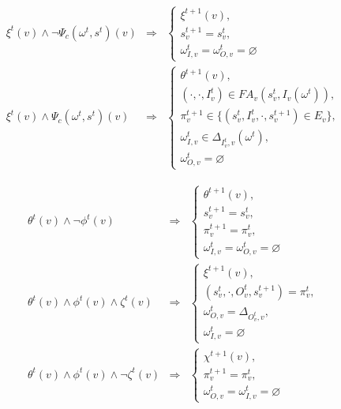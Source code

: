 \documentclass[10pt,a4paper]{article}
\newcommand{\FA}{F\!A}
\begin{document}
\begin{eqnarray}
  \xi^t(v) \wedge \neg \Psi_c(\omega^t, s^t)(v) & \Rightarrow &
    \begin{cases}
      \xi^{t + 1}(v), \\
      s^{t + 1}_v = s^t_v, \\
      \omega^t_{I, v} = \omega^t_{O, v} = \varnothing
    \end{cases} \label{freetofree} \\
  \xi^t(v) \wedge \Psi_c(\omega^t, s^t)(v) & \Rightarrow &
    \begin{cases}
      \theta^{t + 1}(v), \\
      (\cdot, \cdot, I^t_v) \in \FA_v(s^{t}_v, I_v(\omega^t)), \\
      \pi^{t + 1}_v \in \{ (s^t_v, I^t_v, \cdot, s^{t + 1}_v) \in E_v\}, \\
      \omega^t_{I, v} \in \Delta_{I^t_v, v}(\omega^t), \\
      \omega^t_{O, v} = \varnothing
    \end{cases} \label{freetostart}
\end{eqnarray}

\begin{eqnarray}
  \theta^t(v) \wedge \neg \phi^t(v) & \Rightarrow &
   \begin{cases}
     \theta^{t + 1}(v), \\
     s^{t + 1}_v = s^t_v, \\
     \pi^{t + 1}_v = \pi^t_v, \\
     \omega^t_{I, v} = \omega^t_{O, v} = \varnothing
   \end{cases} \label{worktowork} \\
  \theta^t(v) \wedge \phi^t(v) \wedge \zeta^t(v) & \Rightarrow &
    \begin{cases}
      \xi^{t + 1}(v), \\
      (s^t_v, \cdot, O^t_v, s^{t + 1}_v) = \pi^t_v, \\
      \omega^t_{O, v} = \Delta_{O^t_v, v}, \\
      \omega^t_{I, v} = \varnothing
    \end{cases} \label{worktofree}\\
  \theta^t(v) \wedge \phi^t(v) \wedge \neg \zeta^t(v) & \Rightarrow &
    \begin{cases}
      \chi^{t + 1}(v),\\
      \pi^{t + 1}_v = \pi^t_v, \\
      \omega^t_{O, v} = \omega^t_{I, v} = \varnothing
    \end{cases} \label{worktoblock}
\end{eqnarray}
\end{document}
